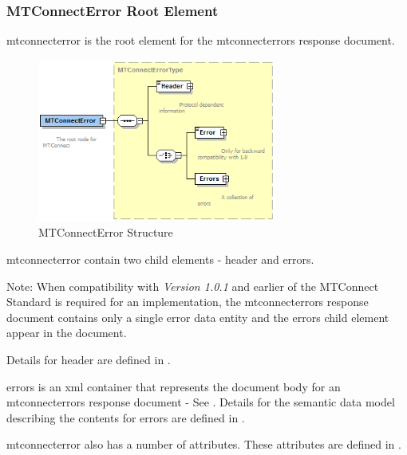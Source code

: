 \documentclass{mtconnect}	%
\begin{document}
\subsubsection{MTConnectError Root Element}

\gls{mtconnecterror} is the \gls{root element} for the \gls{mtconnecterrors response document}.

\begin{figure}[ht]
  \centering
  \includegraphics[width=0.7\textwidth]{figures/mtconnecterror-structure.png}
  \caption{MTConnectError Structure}
  \label{fig:mtconnecterror-structure}
\end{figure}

\FloatBarrier

\gls{mtconnecterror} \MUST contain two \glspl{child element} - \gls{header} and \gls{errors}. 

\begin{note}
Note:	When compatibility with \textit{Version 1.0.1} and earlier of the MTConnect Standard is required for an implementation, the \gls{mtconnecterrors response document} contains only a single \gls{error} \gls{data entity} and the \gls{errors} \gls{child element} \MUSTNOT appear in the document. 

\end{note}

Details for \gls{header} are defined in .  

\gls{errors} is an \gls{xml} container that represents the \gls{document body} for an \gls{mtconnecterrors response document} - See .  Details for the \gls{semantic data model} describing the contents for \gls{errors} are defined in .

\gls{mtconnecterror} also has a number of attributes.  These attributes are defined in .
\end{document}
